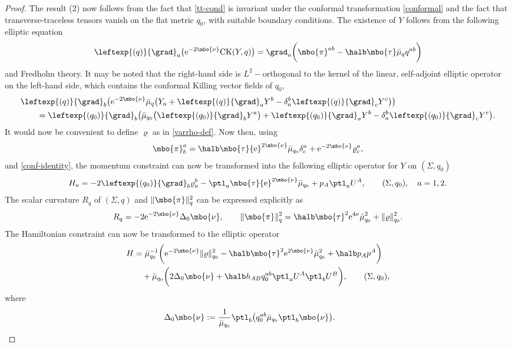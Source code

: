 \begin{proof}
The result (2) now follows from the fact that \eqref{tt-cond} is invariant under the conformal transformation \eqref{conformal} and the fact that transverse-traceless tensors vanish on the flat metric $q_0$, with suitable boundary conditions. The existence of $Y$ follows from the following elliptic equation
\begin{align*}
\leftexp{(q)}{\grad}_a \bigl({\rm e}^{-2 \mbo{\nu}} {\rm CK} (Y, q)\bigr) = \grad_a \biggl(\mbo{\pi}^{ab} -\halb \mbo{\tau} \bar{\mu}_q q^{ab}\biggr)
\end{align*}
 and Fredholm theory. It may be noted that the right-hand side is $L^2-$orthogonal to the kernel of the linear, self-adjoint elliptic operator on the left-hand side, which contains the conformal Killing vector fields of $q_0$,
\begin{align} %
&\leftexp{(q)}{\grad}_b \bigl({\rm e}^{-2\mbo{\nu}} \bar{\mu}_q \bigl(Y_a + \leftexp{(q)}{\grad}_a Y^b - \delta^b_a \leftexp{(q)}{\grad}_c Y^c\bigr) \bigr) \notag\\
&\qquad{}= \leftexp{(q_0)}{\grad}_b \bigl(\bar{\mu}_{q_0}\bigl(\leftexp{(q_0)}{\grad}_b Y^a\bigr) + \leftexp{(q_0)}{\grad}_a Y^b - \delta^b_a \leftexp{(q_0)}{\grad}_c Y^c\bigr) . \label{conf-identity}
\end{align}
It would now be convenient to define $\varrho$ as in \eqref{varrho-def}. Now then, using
\begin{align*}
\mbo{\pi}^a_b = \halb \mbo{\tau} {\rm e}^{2 \mbo{\nu}} \bar{\mu}_{q_0} \delta^a_c + {\rm e}^{-2 \mbo{\nu}} \varrho^a_c,
\end{align*}
and \eqref{conf-identity}, the momentum constraint can now be transformed into the following elliptic operator for $Y$ on $(\Sigma, q_0)$
\begin{align*}
H_a = -2\leftexp{(q_0)}{\grad}_b \varrho^b_a - \ptl_a \mbo{\tau} {\rm e}^{2 \mbo{\nu}} \bar{\mu}_{q_0} + p_A \ptl_a U^A, \qquad (\Sigma, q_0), \quad a= 1, 2.
\end{align*}
The scalar curvature $R_q$ of $(\Sigma, q)$ and $\Vert \mbo{\pi} \Vert^2_q$ can be expressed explicitly as
\begin{align*}
R_q = -2 {\rm e}^{-2 \mbo{\nu}} \Delta_0 \mbo{\nu}, \qquad \Vert \mbo{\pi} \Vert^2_q = \halb \mbo{\tau}^2 {\rm e}^{4 \nu} \bar{\mu}^2_{q_0} + \Vert \varrho \Vert^2_{q_0}.
\end{align*}
The Hamiltonian constraint can now be transformed to the elliptic operator
\begin{align*}
H &{}= \bar{\mu}^{-1}_{q_0} \biggl({\rm e}^{-2 \mbo{\nu}} \Vert \varrho \Vert^2_{q_0} - \halb \mbo{\tau}^2 {\rm e}^{2 \mbo{\nu}} \bar{\mu}^2_{q_0} + \halb p_A p^A\biggr) \notag\\
&\quad{}+ \bar{\mu}_{q_0} \biggl(2 \Delta_0 \mbo{\nu} + \halb h_{AB} q_0^{ab} \ptl_a U^A \ptl_b U^B\biggr), \qquad (\Sigma, q_0),
\end{align*}
where
\begin{align*}
\Delta_0 \mbo{\nu} := \frac{1}{\bar{\mu}_{q_0}} \ptl_b\bigl(q^{ab}_0 \bar{\mu}_{q_0} \ptl_b \mbo{\nu}\bigr).
\tag*{\qed}
\end{align*}
\renewcommand{\qed}{}
\end{proof}

